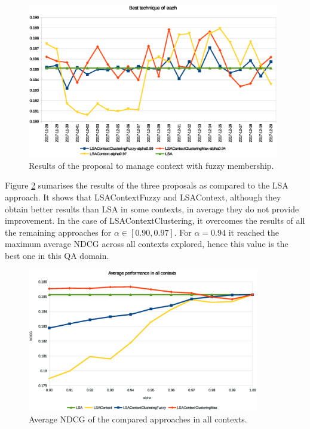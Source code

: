 \documentclass[preprint]{elsarticle}
\begin{document}
\begin{spacing}{1.5}
\begin{figure}[htb]
    \centering
    \includegraphics[width=0.98\textwidth]{figures/ndcg-results-3proposals-bests-per-day.eps}
    \caption{Results of the proposal to manage context with fuzzy membership.}
    \label{fig:ndcg-results-3proposals-bests-per-day}
\end{figure}

Figure \ref{fig:ndcg-results-3proposals-average} sumarises the results of the three proposals as compared to the LSA approach. It shows that LSAContextFuzzy and LSAContext, although they obtain better results than LSA in some contexts, in average they do not provide improvement. In the case of LSAContextClustering, it overcomes the results of all the remaining approaches for $\alpha \in [0.90,0.97]$. For $\alpha=0.94$ it reached the maximum average NDCG across all contexts explored, hence this value is the best one in this QA domain.

\begin{figure}[htb]
    \centering
    \includegraphics[width=0.9\textwidth]{figures/ndcg-results-3proposals-average.eps}
    \caption{Average NDCG of the compared approaches in all contexts.}
    \label{fig:ndcg-results-3proposals-average}
\end{figure}


\end{spacing}
\end{document}
